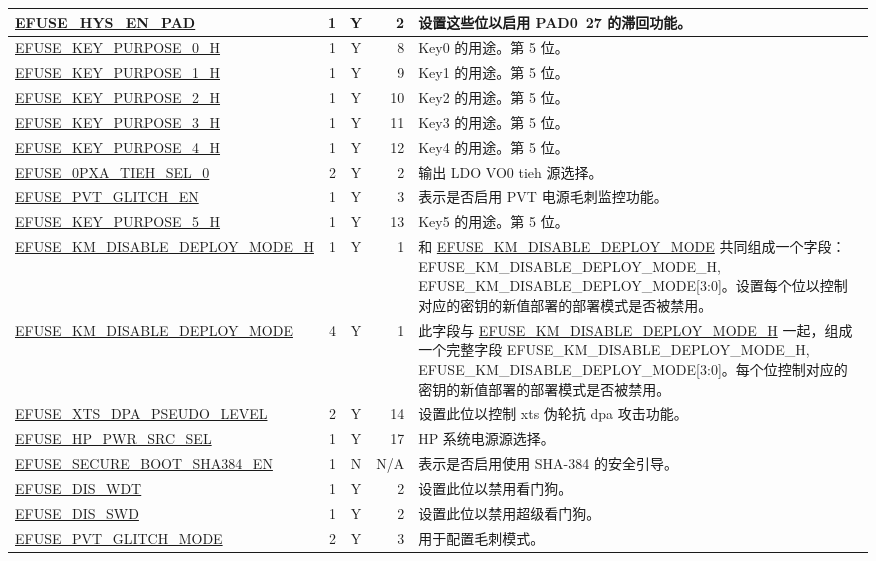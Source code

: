 \begin{longtable}[l]{ |m{8.2cm}|r|c|r|m{9cm}| }
    \hyperref[fielddesc:EFUSEHYSENPAD]{EFUSE\_HYS\_EN\_PAD} & 1 & Y & 2 & 设置这些位以启用 PAD0~27 的滞回功能。 \\ \hline
    \hyperref[fielddesc:EFUSEKEYPURPOSE0H]{EFUSE\_KEY\_PURPOSE\_0\_H} & 1 & Y & 8 & Key0 的用途。第 5 位。 \\ \hline
    \hyperref[fielddesc:EFUSEKEYPURPOSE1H]{EFUSE\_KEY\_PURPOSE\_1\_H} & 1 & Y & 9 & Key1 的用途。第 5 位。 \\ \hline
    \hyperref[fielddesc:EFUSEKEYPURPOSE2H]{EFUSE\_KEY\_PURPOSE\_2\_H} & 1 & Y & 10 & Key2 的用途。第 5 位。 \\ \hline
    \hyperref[fielddesc:EFUSEKEYPURPOSE3H]{EFUSE\_KEY\_PURPOSE\_3\_H} & 1 & Y & 11 & Key3 的用途。第 5 位。 \\ \hline
    \hyperref[fielddesc:EFUSEKEYPURPOSE4H]{EFUSE\_KEY\_PURPOSE\_4\_H} & 1 & Y & 12 & Key4 的用途。第 5 位。 \\ \hline
    \hyperref[fielddesc:EFUSE0PXATIEHSEL0]{EFUSE\_0PXA\_TIEH\_SEL\_0} & 2 & Y & 2 & 输出 LDO VO0 tieh 源选择。 \\ \hline
    \hyperref[fielddesc:EFUSEPVTGLITCHEN]{EFUSE\_PVT\_GLITCH\_EN} & 1 & Y & 3 & 表示是否启用 PVT 电源毛刺监控功能。 \\ \hline
    \hyperref[fielddesc:EFUSEKEYPURPOSE5H]{EFUSE\_KEY\_PURPOSE\_5\_H} & 1 & Y & 13 & Key5 的用途。第 5 位。 \\ \hline
    \hyperref[fielddesc:EFUSEKMDISABLEDEPLOYMODEH]{EFUSE\_KM\_DISABLE\_DEPLOY\_MODE\_H} & 1 & Y & 1 & 和 \hyperref[fielddesc:EFUSEKMDISABLEDEPLOYMODE]{EFUSE\_KM\_DISABLE\_DEPLOY\_MODE} 共同组成一个字段：{EFUSE\_KM\_DISABLE\_DEPLOY\_MODE\_H, EFUSE\_KM\_DISABLE\_DEPLOY\_MODE[3:0]}。设置每个位以控制对应的密钥的新值部署的部署模式是否被禁用。 \\ \hline
    \hyperref[fielddesc:EFUSEKMDISABLEDEPLOYMODE]{EFUSE\_KM\_DISABLE\_DEPLOY\_MODE} & 4 & Y & 1 & 此字段与 \hyperref[fielddesc:EFUSEKMDISABLEDEPLOYMODEH]{EFUSE\_KM\_DISABLE\_DEPLOY\_MODE\_H} 一起，组成一个完整字段 {EFUSE\_\-KM\_\-DISABLE\_\-DEPLOY\_\-MODE\_\-H, EFUSE\_\-KM\_\-DISABLE\_\-DEPLOY\_\-MODE[3:0]}。每个位控制对应的密钥的新值部署的部署模式是否被禁用。 \\ \hline
    \hyperref[fielddesc:EFUSEXTSDPAPSEUDOLEVEL]{EFUSE\_XTS\_DPA\_PSEUDO\_LEVEL} & 2 & Y & 14 & 设置此位以控制 xts 伪轮抗 dpa 攻击功能。 \\ \hline
    \hyperref[fielddesc:EFUSEHPPWRSRCSEL]{EFUSE\_HP\_PWR\_SRC\_SEL} & 1 & Y & 17 & HP 系统电源源选择。 \\ \hline
    \hyperref[fielddesc:EFUSESECUREBOOTSHA384EN]{EFUSE\_SECURE\_BOOT\_SHA384\_EN} & 1 & N & N/A & 表示是否启用使用 SHA-384 的安全引导。 \\ \hline
    \hyperref[fielddesc:EFUSEDISWDT]{EFUSE\_DIS\_WDT} & 1 & Y & 2 & 设置此位以禁用看门狗。 \\ \hline
    \hyperref[fielddesc:EFUSEDISSWD]{EFUSE\_DIS\_SWD} & 1 & Y & 2 & 设置此位以禁用超级看门狗。 \\ \hline
    \hyperref[fielddesc:EFUSEPVTGLITCHMODE]{EFUSE\_PVT\_GLITCH\_MODE} & 2 & Y & 3 & 用于配置毛刺模式。 \\ \hline
    \hline
\end{longtable}
